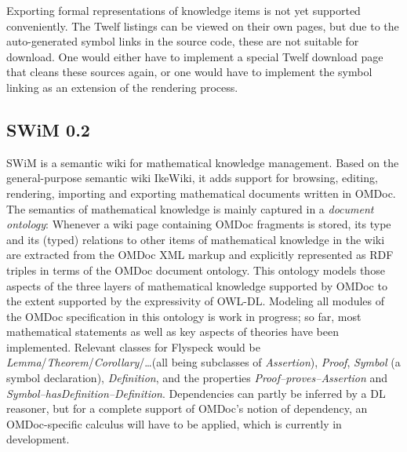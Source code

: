 Exporting formal representations of knowledge items is not yet supported
conveniently.  The Twelf listings can be viewed on their own pages, but due to
the auto-generated symbol links in the source code, these are not suitable for
download.  One would either have to implement a special Twelf download page that
cleans these sources again, or one would have to implement the symbol linking as
an extension of the rendering process.

\subsection{SWiM 0.2}
\label{sec:swim}

SWiM is a semantic wiki for mathematical knowledge management.  Based on the
general-purpose semantic wiki IkeWiki\cite{KrSchVr:semwiki-reasoning07}, it adds support
for browsing, editing, rendering, importing and exporting mathematical documents written
in OMDoc.  The semantics of mathematical knowledge is mainly captured in a \emph{document
  ontology}: Whenever a wiki page containing OMDoc fragments is stored, its type and its
(typed) relations to other items of mathematical knowledge in the wiki are extracted from
the OMDoc XML markup and explicitly represented as RDF triples in terms of the OMDoc
document ontology\cite{OMDocDocOnto:web}.  This ontology models those aspects of the
three layers of mathematical knowledge supported by OMDoc to the extent supported by the
expressivity of OWL-DL.  Modeling all modules of the OMDoc specification in this ontology
is work in progress; so far, most mathematical statements as well as key aspects of
theories have been implemented.  Relevant classes for Flyspeck would be
\textit{Lemma}/\textit{Theorem}/\textit{Corollary}/\ldots (all being subclasses of
\textit{Assertion}), \textit{Proof}, \textit{Symbol} (a symbol declaration),
\textit{Definition}, and the properties \textit{Proof--proves--Assertion} and
\textit{Symbol--hasDefinition--Definition}.  Dependencies can partly be inferred by a DL
reasoner, but for a complete support of OMDoc's notion of dependency, an OMDoc-specific
calculus will have to be applied, which is currently in development.

